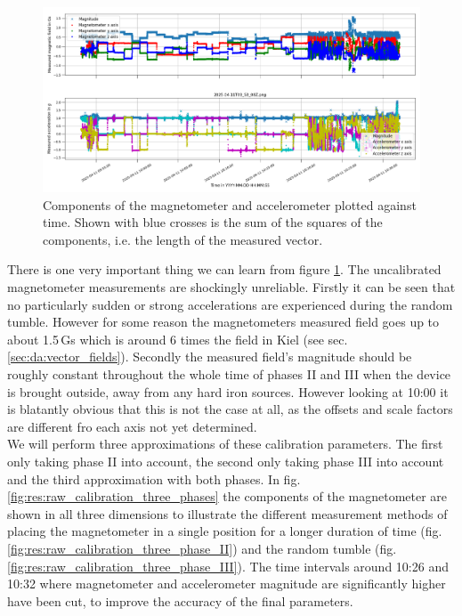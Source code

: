 \begin{figure}[H]
    \centering
    \includegraphics[width=\linewidth]{images/04_results/raw_vectors-2025-04-11.png}
    \caption[Components of the magnetometer and accelerometer plotted against time.]{Components of the magnetometer and accelerometer plotted against time. Shown with blue crosses is the sum of the squares of the components, i.e. the length of the measured vector.}
    \label{fig:res:raw_cali_vectors}
\end{figure}

There is one very important thing we can learn from figure \ref{fig:res:raw_cali_vectors}. The uncalibrated magnetometer measurements are shockingly unreliable. Firstly it can be seen that no particularly sudden or strong accelerations are experienced during the random tumble. However for some reason the magnetometers measured field goes up to about 1.5\,Gs which is around 6 times the field in Kiel (see sec. \ref{sec:da:vector_fields}). Secondly the measured field's magnitude should be roughly constant throughout the whole time of phases II and III when the device is brought outside, away from any hard iron sources. However looking at 10:00 it is blatantly obvious that this is not the case at all, as the offsets and scale factors are different fro each axis not yet determined.\\
We will perform three approximations of these calibration parameters. The first only taking phase II into account, the second only taking phase III into account and the third approximation with both phases. In fig. \ref{fig:res:raw_calibration_three_phases} the components of the magnetometer are shown in all three dimensions to illustrate the different measurement methods of placing the magnetometer in a single position for a longer duration of time (fig. \ref{fig:res:raw_calibration_three_phase_II}) and the random tumble (fig. \ref{fig:res:raw_calibration_three_phase_III}). The time intervals around 10:26 and 10:32 where magnetometer and accelerometer magnitude are significantly higher have been cut, to improve the accuracy of the final parameters.

